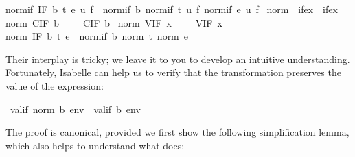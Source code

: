 \begin{isabellebody}
{}normif\ {}IF\ b\ t\ e{}\ u\ f\ {}\ normif\ b\ {}normif\ t\ u\ f{}\ {}normif\ e\ u\ f{}{}\isanewline
\isanewline
{}\isamarkupfalse%
\ norm\ {}{}\ {}ifex\ {}\ ifex{}\ \isanewline
{}norm\ {}CIF\ b{}\ \ \ \ {}\ CIF\ b{}\ {}\isanewline
{}norm\ {}VIF\ x{}\ \ \ \ {}\ VIF\ x{}\ {}\isanewline
{}norm\ {}IF\ b\ t\ e{}\ {}\ normif\ b\ {}norm\ t{}\ {}norm\ e{}{}%
\begin{isamarkuptext}%
\noindent
Their interplay is tricky; we leave it to you to develop an
intuitive understanding. Fortunately, Isabelle can help us to verify that the
transformation preserves the value of the expression:%
\end{isamarkuptext}%
\isamarkuptrue%
\isamarkupfalse%
\ {}valif\ {}norm\ b{}\ env\ {}\ valif\ b\ env{}%
\isadelimproof
%
\endisadelimproof
%
\isatagproof
%
\endisatagproof
{\isafoldproof}%
%
\isadelimproof
%
\endisadelimproof
%
\begin{isamarkuptext}%
\noindent
The proof is canonical, provided we first show the following simplification
lemma, which also helps to understand what  does:%
\end{isamarkuptext}%

\end{isabellebody}
